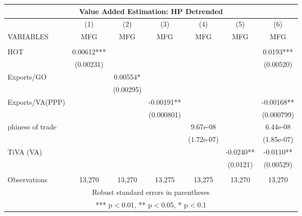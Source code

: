 \documentclass[]{article}
\begin{document}
\begin{tabular}{lcccccc}
\multicolumn{7}{c}{Value Added Estimation: HP Detrended} \\ \hline
 & (1) & (2) & (3) & (4) & (5) & (6) \\
VARIABLES & MFG & MFG & MFG & MFG & MFG & MFG \\ \hline
 &  &  &  &  &  &  \\
HOT & 0.00612*** &  &  &  &  & 0.0193*** \\
 & (0.00231) &  &  &  &  & (0.00520) \\
Exports/GO &  & 0.00554* &  &  &  &  \\
 &  & (0.00295) &  &  &  &  \\
Exports/VA(PPP) &  &  & -0.00191** &  &  & -0.00168** \\
 &  &  & (0.000801) &  &  & (0.000799) \\
phiness of trade &  &  &  & 9.67e-08 &  & 6.44e-08 \\
 &  &  &  & (1.72e-07) &  & (1.85e-07) \\
TiVA (VA) &  &  &  &  & -0.0240** & -0.0110** \\
 &  &  &  &  & (0.0121) & (0.00529) \\
 &  &  &  &  &  &  \\
 Observations & 13,270 & 13,270 & 13,275 & 13,275 & 13,270 & 13,270 \\ \hline
\multicolumn{7}{c}{ Robust standard errors in parentheses} \\
\multicolumn{7}{c}{ *** p$<$0.01, ** p$<$0.05, * p$<$0.1} \\
\end{tabular}
\end{document}
